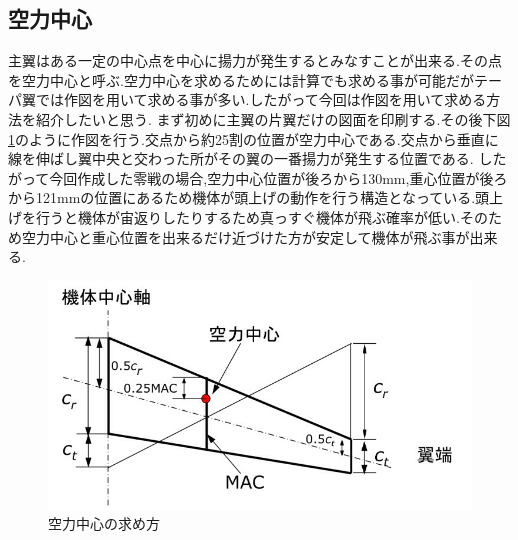 \subsection{空力中心}
主翼はある一定の中心点を中心に揚力が発生するとみなすことが出来る.その点を空力中心と呼ぶ.空力中心を求めるためには計算でも求める事が可能だがテーパ翼では作図を用いて求める事が多い.したがって今回は作図を用いて求める方法を紹介したいと思う.
まず初めに主翼の片翼だけの図面を印刷する.その後下図\ref{fig:yoku}のように作図を行う.交点から約25割の位置が空力中心である.交点から垂直に線を伸ばし翼中央と交わった所がその翼の一番揚力が発生する位置である.
したがって今回作成した零戦の場合,空力中心位置が後ろから130mm,重心位置が後ろから121mmの位置にあるため機体が頭上げの動作を行う構造となっている.頭上げを行うと機体が宙返りしたりするため真っすぐ機体が飛ぶ確率が低い.そのため空力中心と重心位置を出来るだけ近づけた方が安定して機体が飛ぶ事が出来る.
\begin{figure}[htbp]
  \begin{center}
    \includegraphics[width=140mm]{yoku.JPG}
    \end{center}
  \caption{空力中心の求め方}
 \label{fig:yoku}
\end{figure}
